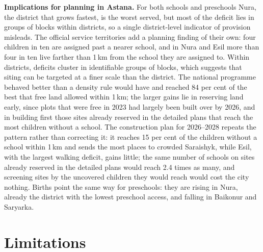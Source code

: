 \textbf{Implications for planning in Astana.} For both schools and preschools Nura, the district that grows fastest, is the worst served, but most of the deficit lies in groups of blocks within districts, so a single district-level indicator of provision misleads. The official service territories add a planning finding of their own: four children in ten are assigned past a nearer school, and in Nura and Esil more than four in ten live farther than 1\,km from the school they are assigned to. Within districts, deficits cluster in identifiable groups of blocks, which suggests that siting can be targeted at a finer scale than the district. The national programme behaved better than a density rule would have and reached 84 per cent of the best that free land allowed within 1\,km; the larger gains lie in reserving land early, since plots that were free in 2023 had largely been built over by 2026, and in building first those sites already reserved in the detailed plans that reach the most children without a school. The construction plan for 2026--2028 repeats the pattern rather than correcting it: it reaches 15 per cent of the children without a school within 1\,km and sends the most places to crowded Saraishyk, while Esil, with the largest walking deficit, gains little; the same number of schools on sites already reserved in the detailed plans would reach 2.4 times as many, and screening sites by the uncovered children they would reach would cost the city nothing. Births point the same way for preschools: they are rising in Nura, already the district with the lowest preschool access, and falling in Baikonur and Saryarka.

\section{Limitations}
\label{sec:limitations}

